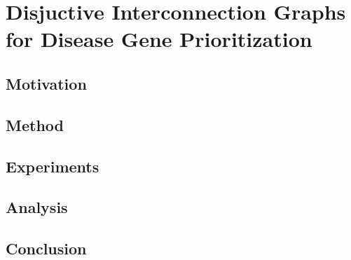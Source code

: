 \chapter{Disjuctive Interconnection Graphs for Disease Gene Prioritization}
\section{Motivation}
\section{Method}
\section{Experiments}
\section{Analysis}
\section{Conclusion}